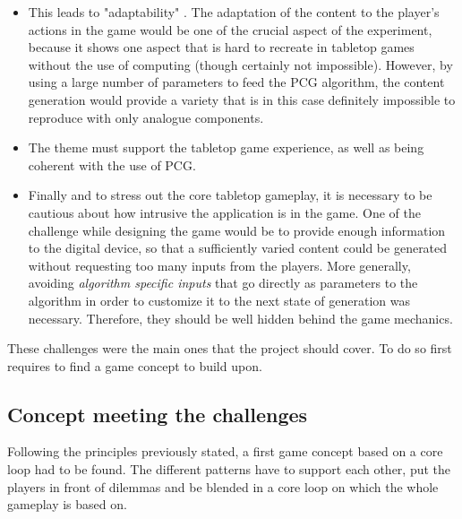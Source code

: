 \begin{itemize}
\item This leads to "adaptability" \cite{pdf:pcgbased}. The adaptation of the content to the player's actions in the game would be one of the crucial aspect of the experiment, because it shows one aspect that is hard to recreate in tabletop games without the use of computing (though certainly not impossible). However, by using a large number of parameters to feed the PCG algorithm, the content generation would provide a variety that is in this case definitely impossible to reproduce with only analogue components.
\item The theme must support the tabletop game experience, as well as being coherent with the use of PCG.
\item Finally and to stress out the core tabletop gameplay, it is necessary to be cautious about how intrusive the application is in the game. One of the challenge while designing the game would be to provide enough information to the digital device, so that a sufficiently varied content could be generated without requesting too many inputs from the players. More generally, avoiding \textit{algorithm specific inputs} that go directly as parameters to the algorithm in order to customize it to the next state of generation was necessary. Therefore, they should be well hidden  behind the game mechanics.
\end{itemize}
These challenges were the main ones that the project should cover. To do so first requires to find a game concept to build upon.
\subsection{Concept meeting the challenges}
Following the principles previously stated, a first game concept based on a core loop had to be found. The different patterns have to support each other, put the players in front of dilemmas and be blended in a core loop on which the whole gameplay is based on.
